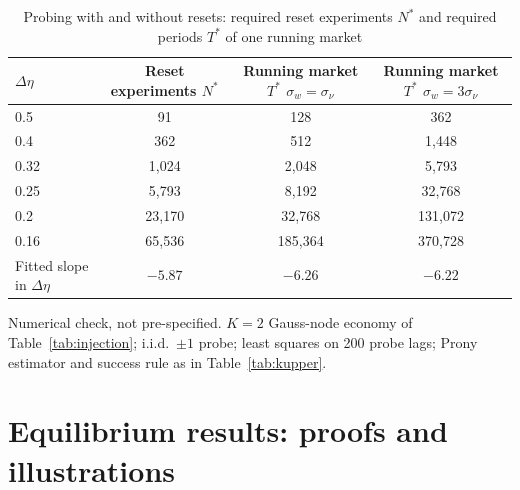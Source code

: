 \documentclass[12pt]{article}
\theoremstyle{definition}
\theoremstyle{remark}
\begin{document}
\begin{table}[!htbp]\centering\small
\begin{threeparttable}
\caption{Probing with and without resets: required reset experiments $N^*$ and required periods $T^*$ of one running market}\label{tab:running}
\begin{tabular}{lccc}
\toprule
$\Delta\eta$ & Reset experiments $N^*$ & \shortstack{Running market $T^*$\\ $\sigma_w=\sigma_\nu$} & \shortstack{Running market $T^*$\\ $\sigma_w=3\sigma_\nu$}\\
\midrule
0.5 & 91 & 128 & 362\\
0.4 & 362 & 512 & 1{,}448\\
0.32 & 1{,}024 & 2{,}048 & 5{,}793\\
0.25 & 5{,}793 & 8{,}192 & 32{,}768\\
0.2 & 23{,}170 & 32{,}768 & 131{,}072\\
0.16 & 65{,}536 & 185{,}364 & 370{,}728\\
\midrule
Fitted slope in $\Delta\eta$ & $-5.87$ & $-6.26$ & $-6.22$\\
\bottomrule
\end{tabular}
\begin{tablenotes}\footnotesize\item Numerical check, not pre-specified. $K=2$ Gauss-node economy of Table~\ref{tab:injection}; i.i.d.\ $\pm1$ probe; least squares on 200 probe lags; Prony estimator and success rule as in Table~\ref{tab:kupper}.\end{tablenotes}
\end{threeparttable}
\end{table}

\section{Equilibrium results: proofs and illustrations}\label{app:eqinv}
\end{document}
